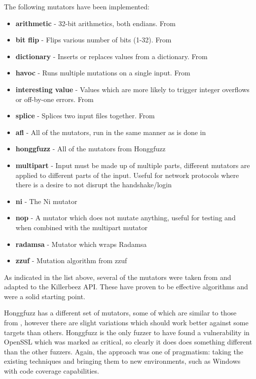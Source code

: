 The following mutators have been implemented:
\begin{itemize}[noitemsep]
\item \textbf{arithmetic} - 32-bit arithmetics, both endians. From \AFL{}
\item \textbf{bit flip} - Flips various number of bits (1-32). From \AFL{}
\item \textbf{dictionary} - Inserts or replaces values from a dictionary. From \AFL{}
\item \textbf{havoc} - Runs multiple mutations on a single input. From \AFL{}
\item \textbf{interesting value} - Values which are more likely to trigger
                                   integer overflows or off-by-one errors. From
                                   \AFL{}
\item \textbf{splice} - Splices two input files together. From \AFL{}
\item \textbf{afl} - All of the \AFL{} mutators, run in the same manner as is
                     done in \AFL{}
\item \textbf{honggfuzz} - All of the mutators from Honggfuzz
\item \textbf{multipart} - Input must be made up of multiple parts, different
                           mutators are applied to different parts of the
                           input. Useful for network protocols where there is
                           a desire to not disrupt the handshake/login
\item \textbf{ni} - The Ni mutator
\item \textbf{nop} - A mutator which does not mutate anything, useful for
                     testing and when combined with the multipart mutator
\item \textbf{radamsa} - Mutator which wraps Radamsa\cite{radamsa}
\item \textbf{zzuf} - Mutation algorithm from zzuf\cite{zzuf}
\end{itemize}

As indicated in the list above, several of the mutators were taken from \AFL{}
and adapted to the Killerbeez API. These have proven to be effective algorithms
and were a solid starting point.

Honggfuzz has a different set of mutators, some of which are similar to those
from \AFL{}, however there are slight variations which should work better
against some targets than others.  Honggfuzz is the only fuzzer to have found a
vulnerability in OpenSSL which was marked as critical, so clearly it does does
something different than the other fuzzers.  Again, the approach was one of pragmatism:
taking the existing techniques and bringing them to new
environments, such as Windows with code coverage capabilities.

